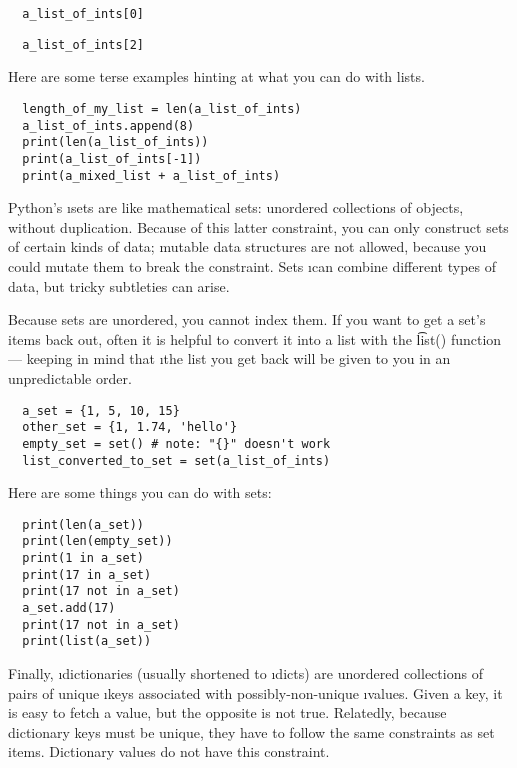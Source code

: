 \documentclass[letterpaper, 12pt, titlepage, twoside]{article}
\begin{document}
\begin{lstlisting}
  a_list_of_ints[0]
\end{lstlisting}

\begin{lstlisting}
  a_list_of_ints[2]
\end{lstlisting}

Here are some terse examples hinting at what you can do with lists.

\begin{lstlisting}
  length_of_my_list = len(a_list_of_ints)
  a_list_of_ints.append(8)
  print(len(a_list_of_ints))
  print(a_list_of_ints[-1])
  print(a_mixed_list + a_list_of_ints)
\end{lstlisting}

Python's \i{sets} are like mathematical sets: unordered collections of
objects, without duplication. Because of this latter constraint, you can only
construct sets of certain kinds of data; mutable data structures are not
allowed, because you could mutate them to break the constraint. Sets \i{can}
combine different types of data, but tricky subtleties can arise.

Because sets are unordered, you cannot index them. If you want to get a set's
items back out, often it is helpful to convert it into a list with the
\t{list()} function --- keeping in mind that \i{the list you get back will be
  given to you in an unpredictable order}.

\begin{lstlisting}
  a_set = {1, 5, 10, 15}
  other_set = {1, 1.74, 'hello'}
  empty_set = set() # note: "{}" doesn't work
  list_converted_to_set = set(a_list_of_ints)
\end{lstlisting}

Here are some things you can do with sets:

\begin{lstlisting}
  print(len(a_set))
  print(len(empty_set))
  print(1 in a_set)
  print(17 in a_set)
  print(17 not in a_set)
  a_set.add(17)
  print(17 not in a_set)
  print(list(a_set))
\end{lstlisting}

Finally, \i{dictionaries} (usually shortened to \i{dicts}) are unordered
collections of pairs of unique \i{keys} associated with possibly-non-unique
\i{values}. Given a key, it is easy to fetch a value, but the opposite is not
true. Relatedly, because dictionary keys must be unique, they have to follow
the same constraints as set items. Dictionary values do not have this
constraint.
\end{document}
